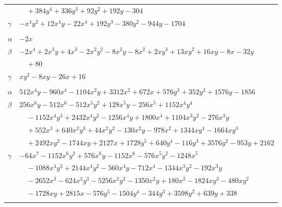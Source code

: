 \documentclass[11pt]{article}
\begin{document}
\begin{longtable}{@{}ll@{}}
 & $\quad +384y^{4}+336y^{3}+92y^{2}+192y-304$\\
$\gamma$ & $-x^{4}y^{2}+12x^{4}y-22x^{4}+192y^{3}-380y^{2}-944y-1704$\\
\addlinespace[3pt]
\multicolumn{2}{@{}l}{$\{i,j\}=\{2,4\}$, $k_{ij}=2^{6}\cdot 3$}\\
$\alpha$ & $-2x$\\
$\beta$ & $-2x^{4}+2x^{3}y+4x^{3}-2x^{2}y^{2}-8x^{2}y-8x^{2}+2xy^{3}+13xy^{2}+16xy-8x-32y$\\
 & $\quad +80$\\
$\gamma$ & $xy^{2}-8xy-26x+16$\\
\addlinespace[3pt]
\multicolumn{2}{@{}l}{$\{i,j\}=\{3,4\}$, $k_{ij}=2^{6}$}\\
$\alpha$ & $512x^{4}y-960x^{4}-1104x^{2}y+3312x^{2}+672x+576y^{3}+352y^{2}+1576y-1856$\\
$\beta$ & $256x^{6}y-512x^{6}-512x^{5}y^{2}+128x^{5}y-256x^{5}+1152x^{4}y^{4}$\\
 & $\quad -1152x^{4}y^{3}+2432x^{4}y^{2}-1256x^{4}y+1800x^{4}+1104x^{3}y^{2}-276x^{3}y$\\
 & $\quad +552x^{3}+640x^{2}y^{3}+44x^{2}y^{2}-130x^{2}y-978x^{2}+1344xy^{4}-1664xy^{3}$\\
 & $\quad +2492xy^{2}-1744xy+2127x+1728y^{5}+640y^{4}-116y^{3}+3576y^{2}-953y+2162$\\
$\gamma$ & $-64x^{7}-1152x^{6}y^{2}+576x^{6}y-1152x^{6}-576x^{5}y^{2}-1248x^{5}$\\
 & $\quad -1088x^{4}y^{3}+2144x^{4}y^{2}-560x^{4}y-712x^{4}-1344x^{3}y^{2}-192x^{3}y$\\
 & $\quad -2652x^{3}-624x^{2}y^{3}-5256x^{2}y^{2}-1350x^{2}y+180x^{2}-1824xy^{3}-480xy^{2}$\\
 & $\quad -1728xy+2815x-576y^{5}-1504y^{4}-344y^{3}+3598y^{2}+639y+338$\\
\addlinespace[3pt]
\end{longtable}
\endgroup
\end{document}
